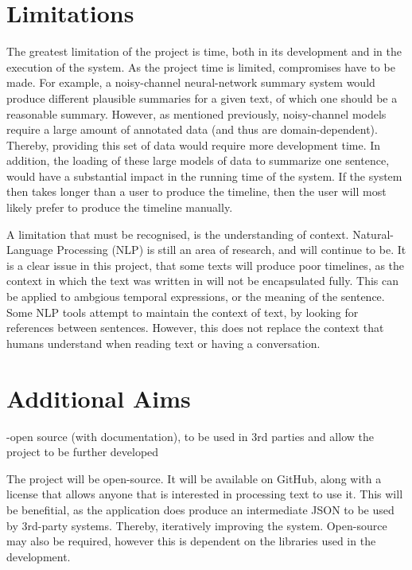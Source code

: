 \section{Limitations}
\par The greatest limitation of the project is time, both in its development and in the execution of the system. As the project time is limited, compromises have to be made. For example, a noisy-channel neural-network summary system would produce different plausible summaries for a given text, of which one should be a reasonable summary. However, as mentioned previously, noisy-channel models require a large amount of annotated data (and thus are domain-dependent). Thereby, providing this set of data would require more development time. In addition, the loading of these large models of data to summarize one sentence, would have a substantial impact in the running time of the system. If the system then takes longer than a user to produce the timeline, then the user will most likely prefer to produce the timeline manually.
\par A limitation that must be recognised, is the understanding of context. Natural-Language Processing (NLP) is still an area of research, and will continue to be. It is a clear issue in this project, that some texts will produce poor timelines, as the context in which the text was written in will not be encapsulated fully. This can be applied to ambgious temporal expressions, or the meaning of the sentence. Some NLP tools attempt to maintain the context of text, by looking for references between sentences. However, this does not replace the context that humans understand when reading text or having a conversation.

\section{Additional Aims} 
-open source (with documentation), to be used in 3rd parties and allow the project to be further developed
\par The project will be open-source. It will be available on GitHub, along with a license that allows anyone that is interested in processing text to use it. This will be benefitial, as the application does produce an intermediate JSON to be used by 3rd-party systems. Thereby, iteratively improving the system. Open-source may also be required, however this is dependent on the libraries used in the development.
